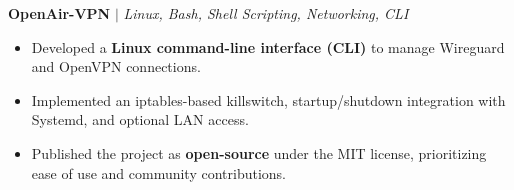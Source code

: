 \documentclass[11pt,letterpaper]{article}
\begin{document}
\begin{list}{}{\setlength{\leftmargin}{1em}\setlength{\rightmargin}{2pt}}
    \item
        \small{\textbf{OpenAir-VPN}} $|$ \small{\textit{Linux, Bash, Shell Scripting, Networking, CLI}} \hfill \small{\textit{}}
          \begin{itemize}[itemsep=-5pt, topsep=-2pt]
              \item Developed a \textbf{Linux command-line interface (CLI)} to manage Wireguard and OpenVPN connections.
              \item Implemented an iptables-based killswitch, startup/shutdown integration with Systemd, and optional LAN access.
              \item Published the project as \textbf{open-source} under the MIT license, prioritizing ease of use and community contributions.
          \end{itemize}
          \vspace{4pt}
    
\end{list}


\end{document}
